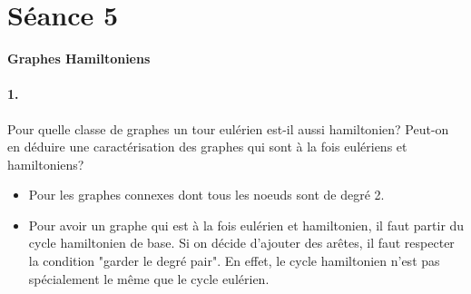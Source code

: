 \section{Séance 5}

\textbf{Graphes Hamiltoniens}

\paragraph{1. } Pour quelle classe de graphes un tour eulérien est-il aussi hamiltonien? Peut-on en déduire une caractérisation des graphes qui sont à la fois eulériens et hamiltoniens?
\begin{solution}
\begin{itemize}
\item Pour les graphes connexes dont tous les noeuds sont de degré 2.
\item Pour avoir un graphe qui est à la fois eulérien et hamiltonien, il faut partir du cycle hamiltonien de base. Si on décide d'ajouter des arêtes, il faut respecter la condition "garder le degré pair". En effet, le cycle hamiltonien n'est pas spécialement le même que le cycle eulérien.
\end{itemize}
\end{solution}

